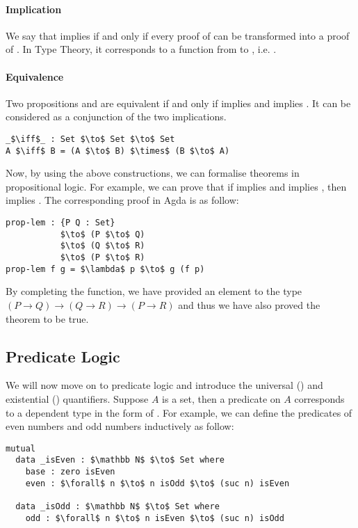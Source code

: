 \paragraph{Implication} We say that  implies  if and only
if every proof of  can be transformed into a proof of . In Type
Theory, it corresponds to a function from  to , i.e. . 

\paragraph{Equivalence} Two propositions  and
 are equivalent if and only if  implies  and  implies
. It can be considered as a conjunction of the two implications.
\begin{lstlisting}[mathescape=true,xleftmargin=.3\textwidth]
_$\iff$_ : Set $\to$ Set $\to$ Set
A $\iff$ B = (A $\to$ B) $\times$ (B $\to$ A)
\end{lstlisting} 

\par Now, by using the above constructions, we can formalise
 theorems in propositional logic. For example, we can prove that if  implies  and
 implies , then  implies . The corresponding
proof in Agda is as follow:
\begin{lstlisting}[mathescape=true,xleftmargin=.3\textwidth]
prop-lem : {P Q : Set} 
           $\to$ (P $\to$ Q) 
           $\to$ (Q $\to$ R) 
           $\to$ (P $\to$ R)
prop-lem f g = $\lambda$ p $\to$ g (f p)
\end{lstlisting} 

\par By completing the function, we have provided an element
to the type \((P \to Q) \to (Q \to R) \to (P \to R)\) and thus we have
also proved the theorem to be true. 


\subsection{Predicate Logic} 
\par We will now move on to predicate logic and
introduce the universal (\mb{\forall}) and existential (\mb{\exists})
quantifiers. Suppose \(A\) is a set, then a predicate on \(A\) corresponds to a dependent type in the
form of . For example, we can
define the predicates of even numbers and odd numbers inductively as follow:
\begin{lstlisting}[mathescape=true,xleftmargin=.25\textwidth]
mutual
  data _isEven : $\mathbb N$ $\to$ Set where
    base : zero isEven
    even : $\forall$ n $\to$ n isOdd $\to$ (suc n) isEven

  data _isOdd : $\mathbb N$ $\to$ Set where
    odd : $\forall$ n $\to$ n isEven $\to$ (suc n) isOdd
\end{lstlisting} 

